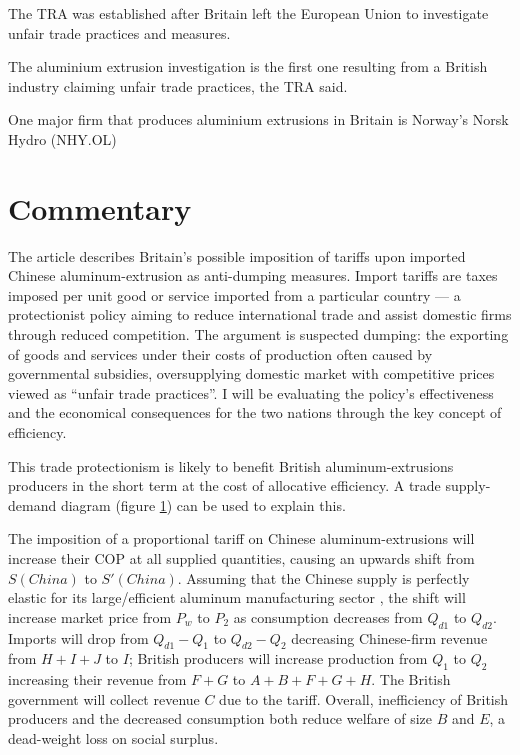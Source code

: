 \documentclass[a4paper,12pt]{article}
\newcommand{\tikzfig}[1]{}
\begin{document}
The TRA was established after Britain left the European Union to investigate unfair trade practices and measures.

The aluminium extrusion investigation is the first one resulting from a British industry claiming unfair trade practices, the TRA said.

One major firm that produces aluminium extrusions in Britain is Norway's Norsk Hydro (NHY.OL)

\newpage
\section*{Commentary}


The article describes Britain's possible imposition of tariffs upon imported Chinese aluminum-extrusion as anti-dumping measures. Import tariffs are taxes imposed per unit good or service imported from a particular country --- a protectionist policy aiming to reduce international trade and assist domestic firms through reduced competition. The argument is suspected dumping: the exporting of goods and services under their costs of production often caused by governmental subsidies, oversupplying domestic market with competitive prices viewed as ``unfair trade practices''. I will be evaluating the policy's effectiveness and the economical consequences for the two nations through the key concept of efficiency.

This trade protectionism is likely to benefit British aluminum-extrusions producers in the short term at the cost of allocative efficiency. A trade supply-demand diagram (figure \ref{fig:tariff}) can be used to explain this.

\begin{figure}[H]
	\centering
	 \tikzfig{assets/tariffs.txt}
	\caption{}
	\label{fig:tariff}
\end{figure}

The imposition of a proportional tariff on Chinese aluminum-extrusions will increase their COP at all supplied quantities, causing an upwards shift from $S(China)$ to $S'(China)$. Assuming that the Chinese supply is perfectly elastic for its large/efficient aluminum manufacturing sector \parencite{ilzetzki_2022}, the shift will increase market price from $P_w$ to $P_2$ as consumption decreases from $Q_{d1}$ to $Q_{d2}$.
Imports will drop from $Q_{d1}-Q_{1}$ to $Q_{d2}-Q_{2}$ decreasing Chinese-firm revenue from $H+I+J$ to $I$; British producers will increase production from $Q_1$ to $Q_2$ increasing their revenue from $F+G$ to $A+B+F+G+H$. The British government will collect revenue $C$ due to the tariff. Overall, inefficiency of British producers and the decreased consumption both reduce welfare of size $B$ and $E$, a dead-weight loss on social surplus.
\end{document}
